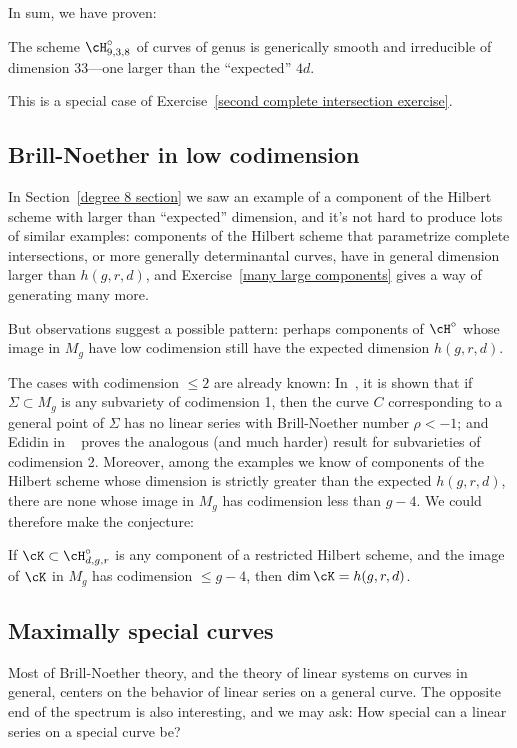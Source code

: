 In sum, we have proven:
\begin{proposition}
 The scheme $\cH^\circ_{9,3,8}$ of curves of genus  is generically smooth and irreducible of dimension 33---one larger than the ``expected'' $4d$.
\end{proposition}

This is a special case of Exercise~\ref{second complete intersection exercise}.

\subsection{Brill-Noether in low codimension}
 
In Section~\ref{degree 8 section} we saw an example of a component of the Hilbert scheme with larger than ``expected'' dimension, and it's not hard to produce lots of similar examples: components of the Hilbert scheme that parametrize complete intersections, or more generally determinantal curves, have in general dimension larger than $h(g,r,d)$, and Exercise~\ref{many large components} gives a way of generating many more.

 But observations suggest a possible pattern: perhaps components of $\cH^\circ$ whose image in $M_g$ have low codimension still have the expected dimension $h(g,r,d)$. 

The cases with codimension $\leq 2$ are already known: In~\cite{BrillNoether-1}, it is shown that if $\Sigma \subset M_g$ is any subvariety of codimension 1, then the curve $C$ corresponding to a general point of $\Sigma$ has no linear series with Brill-Noether number $\rho < -1$; and Edidin in ~\cite{Edidin} proves the analogous (and much harder) result for subvarieties of codimension 2. Moreover, among the examples we know of components of the Hilbert scheme whose dimension is strictly greater than the expected $h(g,r,d)$, there are none whose image in $M_g$ has codimension less than $g-4$. We could therefore make the conjecture:

\begin{conjecture}
If $\cK \subset \cH^\circ_{d,g,r}$ is any component of a restricted Hilbert scheme, and the image of $\cK$ in $M_g$ has codimension $\leq g-4$, then $\dim \cK = h(g,r,d)$.
\end{conjecture}

\subsection{Maximally special  curves} Most of Brill-Noether theory, and the theory of linear systems on curves in general, centers on the behavior of linear series on a general curve. The opposite end of the spectrum is also interesting, and we may ask: How special can a linear series on a special curve be?

